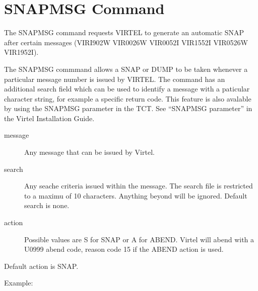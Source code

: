 \documentclass[letterpaper,10pt,english]{sphinxmanual}
\begin{document}

\section{SNAPMSG Command}
\label{\detokenize{audit_operations_ and_performance:index-20}}\label{\detokenize{audit_operations_ and_performance:snapmsg-command}}
\begin{sphinxVerbatim}[commandchars=\\\{\}]
\end{sphinxVerbatim}

The SNAPMSG command requests VIRTEL to generate an automatic SNAP after certain messages (VIRI902W VIR0026W VIR0052I VIR1552I VIR0526W VIR1952I).

\begin{sphinxVerbatim}[commandchars=\\\{\}]
\end{sphinxVerbatim}

The SNAPMSG commmand allows a SNAP or DUMP to be taken whenever a particular message number is issued by VIRTEL. The command has an additional search field which can be used to identify a message with a paticular character string, for example a specific return code. This feature is also avalable by using the SNAPMSG parameter in the TCT. See “SNAPMSG parameter” in the Virtel Installation Guide.
\begin{description}
\item[{message}] \leavevmode
Any message that can be issued by Virtel.

\item[{search}] \leavevmode
Any seache criteria issued within the message. The search file is restricted to a maximu of 10 characters. Anything beyond will be ignored. Default search is none.

\item[{action}] \leavevmode
Possible values are S for SNAP or A for ABEND. Virtel will abend with a U0999 abend code, reason code 15 if the ABEND action is used.

\end{description}

Default action is SNAP.

Example:

\begin{sphinxVerbatim}[commandchars=\\\{\}]
 
\end{sphinxVerbatim}
\end{document}

